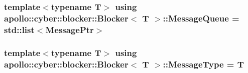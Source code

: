 \hypertarget{classapollo_1_1cyber_1_1blocker_1_1Blocker_a4c973a5afc09ca2b666f9436f2e74189}{
\subsubsection[{Message\-Queue}]{\setlength{\rightskip}{0pt plus 5cm}template$<$typename T$>$ using {\bf apollo\-::cyber\-::blocker\-::\-Blocker}$<$ T $>$\-::{\bf Message\-Queue} =  std\-::list$<${\bf Message\-Ptr}$>$}}\label{classapollo_1_1cyber_1_1blocker_1_1Blocker_a4c973a5afc09ca2b666f9436f2e74189}
\hypertarget{classapollo_1_1cyber_1_1blocker_1_1Blocker_ab6f5eb86a03109c66581e377a896650a}{
\subsubsection[{Message\-Type}]{\setlength{\rightskip}{0pt plus 5cm}template$<$typename T$>$ using {\bf apollo\-::cyber\-::blocker\-::\-Blocker}$<$ T $>$\-::{\bf Message\-Type} =  T}}\label{classapollo_1_1cyber_1_1blocker_1_1Blocker_ab6f5eb86a03109c66581e377a896650a}


